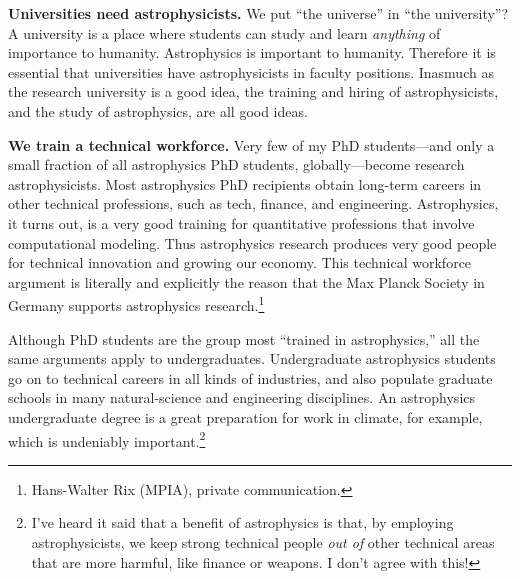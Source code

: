 \documentclass{article}
\newcommand{\paragraphskip}{\medskip}
\renewcommand{\paragraph}[1]{\par\paragraphskip\noindent\textbf{#1}}
\begin{document}
\paragraph{Universities need astrophysicists.}
We put ``the universe'' in ``the university''?
A university is a place where students can study and learn \emph{anything} of importance to humanity.
Astrophysics is important to humanity.
Therefore it is essential that universities have astrophysicists in faculty positions.
Inasmuch as the research university is a good idea, the training and hiring of astrophysicists, and the study of astrophysics, are all good ideas.

\paragraph{We train a technical workforce.}
Very few of my PhD students---and only a small fraction of all astrophysics PhD students, globally---become research astrophysicists.
Most astrophysics PhD recipients obtain long-term careers in other technical professions, such as tech, finance, and engineering.
Astrophysics, it turns out, is a very good training for quantitative professions that involve computational modeling.
Thus astrophysics research produces very good people for technical innovation and growing our economy.
This technical workforce argument is literally and explicitly the reason that the Max Planck Society in Germany supports astrophysics research.\footnote{Hans-Walter Rix (MPIA), private communication.}

Although PhD students are the group most ``trained in astrophysics,'' all the same arguments apply to undergraduates.
Undergraduate astrophysics students go on to technical careers in all kinds of industries,
and also populate graduate schools in many natural-science and engineering disciplines.
An astrophysics undergraduate degree is a great preparation for work in climate, for example, which is undeniably important.\footnote{%
I've heard it said that a benefit of astrophysics is that, by employing astrophysicists, we keep strong technical people \emph{out of} other technical areas that are more harmful, like finance or weapons.
I don't agree with this!}
\end{document}
